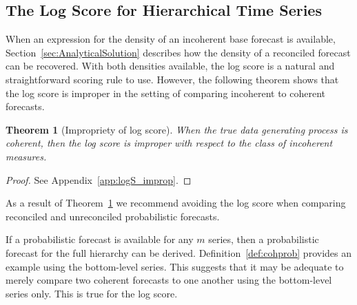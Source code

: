 \documentclass[11pt]{article}
\newtheorem{theo}{Theorem}[section]
\theoremstyle{definition}
\begin{document}


\subsection{The Log Score for Hierarchical Time Series}

When an expression for the density of an incoherent base forecast is available, Section~\ref{sec:AnalyticalSolution} describes how the density of a reconciled forecast can be recovered. With both densities available, the log score is a natural and straightforward scoring rule to use. However, the following theorem shows that the log score is improper in the setting of comparing incoherent to coherent forecasts.

\begin{theo}[Impropriety of log score]\label{theo:logS_improp}
	When the true data generating process is coherent, then the log score is improper with respect to the class of incoherent measures.
\end{theo}

\begin{proof}
	See Appendix~\ref{app:logS_improp}.
\end{proof}

As a result of Theorem~\ref{theo:logS_improp} we recommend avoiding the log score when comparing reconciled and unreconciled probabilistic forecasts.

If a probabilistic forecast is available for any $m$ series, then a probabilistic forecast for the full hierarchy can be derived. Definition~\ref{def:cohprob} provides an example using the bottom-level series. This suggests that it may be adequate to merely compare two coherent forecasts to one another using the bottom-level series only. This is true for the log score.
\end{document}
